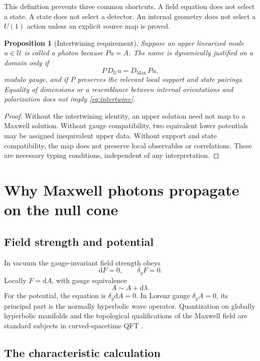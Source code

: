 \documentclass[11pt,a4paper]{article}
\numberwithin{equation}{section}
\newtheorem{proposition}[theorem]{Proposition}
\theoremstyle{definition}
\theoremstyle{remark}
\newcommand{\dd}{\mathrm{d}}
\newcommand{\cU}{\mathcal U}
\begin{document}
This definition prevents three common shortcuts.  A field equation does
not select a state.  A state does not select a detector.  An internal
geometry does not select a \(U(1)\) action unless an explicit source map
is proved.

\begin{proposition}[Intertwining requirement]
Suppose an upper linearized mode \(u\in\cU\) is called a photon because
\(P u=A\).  The name is dynamically justified on a domain only if
\[
P\,D_{\cU}u=D_{\mathrm{Max}}\,Pu,
\label{eq:intertwine}
\]
modulo gauge, and if \(P\) preserves the relevant local support and state
pairings.  Equality of dimensions or a resemblance between internal
orientations and polarization does not imply \eqref{eq:intertwine}.
\end{proposition}

\begin{proof}
Without the intertwining identity, an upper solution need not map to a
Maxwell solution.  Without gauge compatibility, two equivalent lower
potentials may be assigned inequivalent upper data.  Without support and
state compatibility, the map does not preserve local observables or
correlations.  These are necessary typing conditions, independent of any
interpretation.
\end{proof}

\section{Why Maxwell photons propagate on the null cone}

\subsection{Field strength and potential}

In vacuum the gauge-invariant field strength obeys
\begin{equation}
\dd F=0,\qquad \delta_g F=0.
\label{eq:maxwell}
\end{equation}
Locally \(F=\dd A\), with gauge equivalence
\[
A\sim A+\dd\lambda.
\]
For the potential, the equation is
\(\delta_g\dd A=0\).  In Lorenz gauge
\(\delta_g A=0\), its principal part is the normally hyperbolic wave
operator.  Quantization on globally hyperbolic manifolds and the
topological qualifications of the Maxwell field are standard subjects
in curved-spacetime QFT \cite{Dimock1992,FewsterLang2016,BFV2003}.

\subsection{The characteristic calculation}
\end{document}
